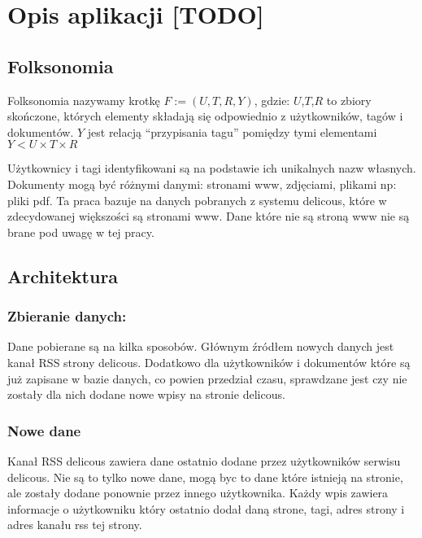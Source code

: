 \chapter{Opis aplikacji [TODO]}

\section{Folksonomia}

Folksonomia nazywamy krotkę $F := (U,T,R,Y)$, gdzie:
$U$,$T$,$R$ to zbiory skończone, których elementy składają się odpowiednio z użytkowników, tagów i dokumentów. $Y$ jest relacją “przypisania tagu” pomiędzy tymi elementami $Y < U \times T \times R$

Użytkownicy i tagi identyfikowani są na podstawie ich unikalnych nazw własnych. Dokumenty mogą być różnymi danymi: stronami www, zdjęciami, plikami np: pliki pdf. Ta praca bazuje na danych pobranych z systemu delicous, które w zdecydowanej większości są stronami www. Dane które nie są stroną www nie są brane pod uwagę w tej pracy. 

\section{Architektura}

\subsection{Zbieranie danych:}

Dane pobierane są na kilka sposobów. Głównym źródłem nowych danych jest kanał RSS strony delicous. Dodatkowo dla użytkowników i dokumentów które są już zapisane w bazie danych, co powien przedział czasu, sprawdzane jest czy nie zostały dla nich dodane nowe wpisy na stronie delicous.

\subsection*{Nowe dane}
Kanał RSS delicous zawiera dane ostatnio dodane przez użytkowników serwisu delicous. Nie są to tylko nowe dane, mogą byc to dane które istnieją na stronie, ale zostały dodane ponownie przez innego użytkownika. Każdy wpis zawiera informacje o użytkowniku który ostatnio dodał daną strone, tagi, adres strony i adres kanału rss tej strony. 


